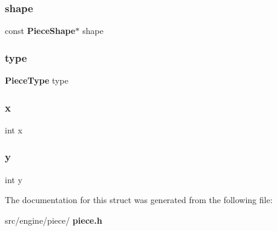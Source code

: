 \mbox{\label{structPiece_ad98d3b155e2d7b43f0eaacdad5465829}} 
\subsubsection{shape}
{\footnotesize\ttfamily const \textbf{ Piece\+Shape}$\ast$ shape}

\mbox{\label{structPiece_a7bbc30d6dbbc70180417e3bb006b52e9}} 
\subsubsection{type}
{\footnotesize\ttfamily \textbf{ Piece\+Type} type}

\mbox{\label{structPiece_a6150e0515f7202e2fb518f7206ed97dc}} 
\subsubsection{x}
{\footnotesize\ttfamily int x}

\mbox{\label{structPiece_a0a2f84ed7838f07779ae24c5a9086d33}} 
\subsubsection{y}
{\footnotesize\ttfamily int y}



The documentation for this struct was generated from the following file\+:\begin{DoxyCompactItemize}
\item 
src/engine/piece/\textbf{ piece.\+h}\end{DoxyCompactItemize}
